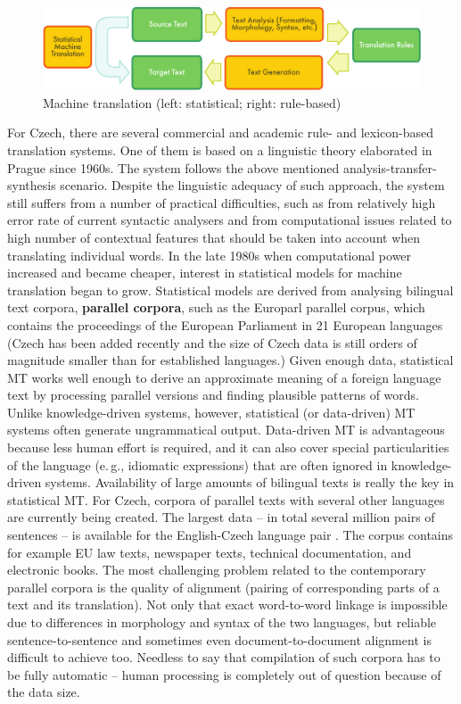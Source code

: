 \begin{multicols}{2}
\begin{figure}[htb]
  \center
  \includegraphics[width=\textwidth]{../_media/english/machine_translation}
  \caption{Machine translation (left: statistical; right: rule-based)}
  \label{fig:mtarch_en}
\end{figure}

For Czech, there are several commercial and academic rule- and lexicon-based translation systems. One of them is based on a linguistic theory elaborated in Prague since 1960s. The system follows the above mentioned analysis-transfer-synthesis scenario. Despite the linguistic adequacy of such approach, the system still suffers from a number of practical difficulties, such as from relatively high error rate of current syntactic analysers and from computational issues related to high number of contextual features that should be taken into account when translating individual words.
In the late 1980s when computational power increased and became cheaper, interest in statistical models for machine translation began to grow. Statistical models are derived from analysing bilingual text corpora, \textbf{parallel corpora}, such as the Europarl parallel corpus, which contains the proceedings of the European Parliament in 21 European languages (Czech has been added recently and the size of Czech data is still orders of magnitude smaller than for established languages.) Given enough data, statistical MT works well enough to derive an approximate meaning of a foreign language text by processing parallel versions and finding plausible patterns of words. Unlike knowledge-driven systems, however, statistical (or data-driven) MT systems often generate ungrammatical output. Data-driven MT is advantageous because less human effort is required, and it can also cover special particularities of the language (e.\,g., idiomatic expressions) that are often ignored in knowledge-driven systems. 
Availability of large amounts of bilingual texts is really the key in statistical MT. For Czech, corpora of parallel texts with several other languages are currently being created. The largest data – in total several million pairs of sentences – is available for the English-Czech language pair \cite{Note20}. The corpus contains for example EU law texts, newspaper texts, technical documentation, and electronic books. The most challenging problem related to the contemporary parallel corpora is the quality of alignment (pairing of corresponding parts of a text and its translation). Not only that exact word-to-word linkage is impossible due to differences in morphology and syntax of the two languages, but reliable sentence-to-sentence and sometimes even document-to-document alignment is difficult to achieve too. Needless to say that compilation of such corpora has to be fully automatic – human processing is completely out of question because of the data size.


\end{multicols}
